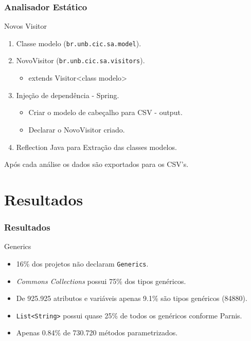 \documentclass[]{beamer}
\begin{document}
\begin{frame}[label=metodologia, fragile]
	\frametitle{Analisador Estático}
	\begin{block}{Novos Visitor}
		\begin{enumerate}
			\item Classe modelo (\texttt{br.unb.cic.sa.model}).
			\item NovoVisitor (\texttt{br.unb.cic.sa.visitors}).
				\begin{itemize}
					\item extends Visitor<class modelo>
				\end{itemize}
			
			\item Injeção de dependência - Spring.
					\begin{itemize}
						\item Criar o modelo de cabeçalho para CSV - output.
						\item Declarar o NovoVisitor criado.
					\end{itemize}
		
			\item Reflection Java para Extração das classes modelos.
			\end{enumerate}
			
			Após cada análise os dados são exportados para os CSV's.
		
	\end{block}
\end{frame}

	

	\section{Resultados}
	
	\begin{frame}[fragile, label=re]\frametitle{Resultados}
		\begin{block}{Generics}
			\begin{itemize}
				\item 16\% dos projetos não declaram \texttt{Generics}.
				
				\item \textit{Commons Collections} possui 75\% dos tipos genéricos.
				
				\item De 925.925 atributos e variáveis apenas 9.1\% são tipos genéricos (84880).
				
				\item \texttt{List<String>} possui quase 25\% de todos os genéricos conforme Parnis.
				
				\item Apenas 0.84\% de 730.720 métodos parametrizados.
				
				
			\end{itemize}
		\end{block}
	\end{frame}
\end{document}

